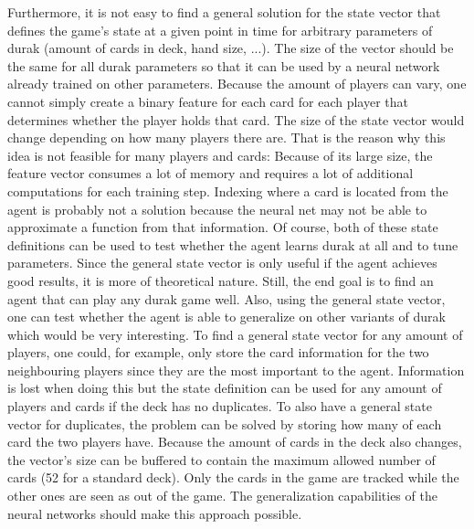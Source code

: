 \documentclass[a4paper,titlepage]{article}
\begin{document}
Furthermore, it is not easy to find a general solution for the state vector that defines the game's state at a given point in time for arbitrary parameters of durak (amount of cards in deck, hand size, ...). The size of the vector should be the same for all durak parameters so that it can be used by a neural network already trained on other parameters. Because the amount of players can vary, one cannot simply create a binary feature for each card for each player that determines whether the player holds that card. The size of the state vector would change depending on how many players there are. 
That is the reason why this idea is not feasible for many players and cards: Because of its large size, the feature vector consumes a lot of memory and requires a lot of additional computations for each training step. Indexing where a card is located from the agent is probably not a solution %
because the neural net may not be able to approximate a function from that information. Of course, both of these state definitions can be used to test whether the agent learns durak at all and to tune parameters. Since the general state vector is only useful if the agent achieves good results, it is more of theoretical nature. Still, the end goal is to find an agent that can play any durak game well. Also, using the general state vector, one can test whether the agent is able to generalize on other variants of durak which would be very interesting.
To find a general state vector for any amount of players, one could, for example, only store the card information %
for the two neighbouring players since they are the most important to the agent. Information is lost when doing this but the state definition can be used for any amount of players and cards if the deck has no duplicates. To also have a general state vector for duplicates, the problem can be solved by storing how many of each card the two players have.
Because the amount of cards in the deck also changes, the vector's size can be buffered to contain the maximum allowed number of cards (52 for a standard deck). Only the cards in the game are tracked while the other ones are seen as out of the game. The generalization capabilities of the neural networks should make this approach possible.
\end{document}
